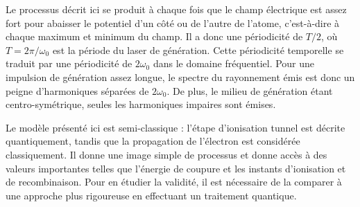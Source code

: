 Le processus décrit ici se produit à chaque fois que le champ électrique est assez fort pour abaisser le potentiel d'un côté ou de l'autre de l'atome, c'est-à-dire à chaque maximum et minimum du champ. Il a donc une périodicité de $T/2$, où $T = 2\pi/\omega_0$ est la période du laser de génération. Cette périodicité temporelle se traduit par une périodicité de $2\omega_0$ dans le domaine fréquentiel. Pour une impulsion de génération assez longue, le spectre du rayonnement émis est donc un peigne d'harmoniques séparées de $2\omega_0$. De plus, le milieu de génération étant centro-symétrique, seules les harmoniques impaires sont émises.

Le modèle présenté ici est semi-classique : l'étape d'ionisation tunnel est décrite quantiquement, tandis que la propagation de l'électron est considérée classiquement. Il donne une image simple de processus et donne accès à des valeurs importantes telles que l'énergie de coupure et les instants d'ionisation et de recombinaison. Pour en étudier la validité, il est nécessaire de la comparer à une approche plus rigoureuse en effectuant un traitement quantique.

